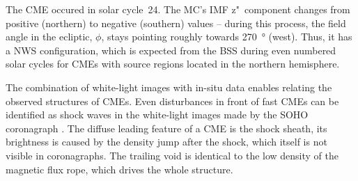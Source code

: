 The CME occured in solar cycle~24. The MC's IMF z"~component changes from positive (northern) to negative (southern) values -- during this process, the field angle in the ecliptic, $\phi$, stays pointing roughly towards \SI{270}{\degree} (west). Thus, it has a NWS configuration, which is expected from the BSS during even numbered solar cycles for CMEs with source regions located in the northern hemisphere.

The combination of white-light images with in-situ data enables relating the observed structures of CMEs. Even disturbances in front of fast CMEs can be identified as shock waves in the white-light images made by the SOHO coronagraph \citep{Sheeley2000}. The diffuse leading feature of a CME is the shock sheath, its brightness is caused by the density jump after the shock, which itself is not visible in coronagraphs. The trailing void is identical to the low density of the magnetic flux rope, which drives the whole structure.

